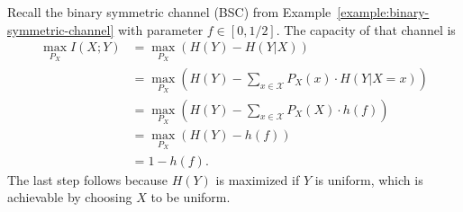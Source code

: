 \begin{example}
Recall the binary symmetric channel (BSC) from Example~\ref{example:binary-symmetric-channel} with parameter $f \in [0,1/2]$. The capacity of that channel is
\begin{align*}
\max_{P_X} I(X;Y) &= \max_{P_X} \left( H(Y) - H(Y|X)\right)\\
&= \max_{P_X} \left( H(Y) - \sum_{x \in \mathcal{X}} P_X(x) \cdot H(Y|X=x)\right)\\
&= \max_{P_X} \left( H(Y) - \sum_{x \in \mathcal{X}} P_X(X) \cdot h(f)\right)\\
&= \max_{P_X} \left( H(Y) - h(f)\right)\\
&= 1- h(f).
\end{align*}
The last step follows because $H(Y)$ is maximized if $Y$ is uniform, which is achievable by choosing $X$ to be uniform.
\end{example}

